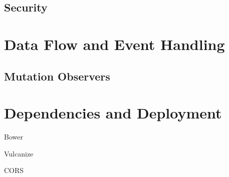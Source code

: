 \subsection{Security}

\section{Data Flow and Event Handling}

\subsection{Mutation Observers}

\section{Dependencies and Deployment}

Bower

Vulcanize

CORS

